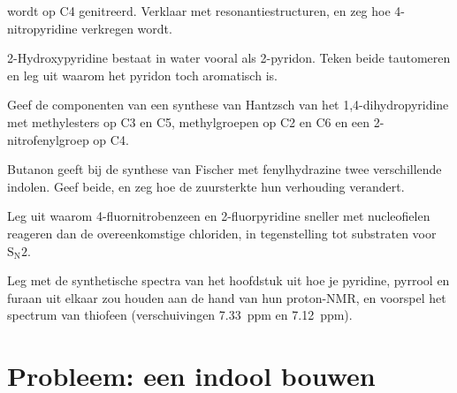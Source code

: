 \begin{exercise}[$\star\star$]\label{exo:b3:heterocycles:7}
 wordt op C4 genitreerd. Verklaar met
resonantiestructuren, en zeg hoe 4-nitropyridine verkregen wordt.
\end{exercise}

\begin{exercise}[$\star\star$]\label{exo:b3:heterocycles:8}
2-Hydroxypyridine bestaat in water vooral als 2-pyridon. Teken beide
tautomeren en leg uit waarom het pyridon toch aromatisch is.
\end{exercise}

\begin{exercise}[$\star\star$]\label{exo:b3:heterocycles:9}
Geef de componenten van een synthese van Hantzsch van het
1,4-dihydropyridine met methylesters op C3 en C5, methylgroepen op C2 en
C6 en een 2-nitrofenylgroep op C4.
\end{exercise}

\begin{exercise}[$\star\star\star$]\label{exo:b3:heterocycles:10}
Butanon geeft bij de synthese van Fischer met fenylhydrazine twee
verschillende indolen. Geef beide, en zeg hoe de zuursterkte hun
verhouding verandert.
\end{exercise}

\begin{exercise}[$\star\star\star$]\label{exo:b3:heterocycles:11}
Leg uit waarom 4-fluornitrobenzeen en 2-fluorpyridine sneller met
nucleofielen reageren dan de overeenkomstige chloriden, in tegenstelling tot substraten voor $\mathrm S_\mathrm N2$.
\end{exercise}

\begin{exercise}[$\star\star\star$]\label{exo:b3:heterocycles:12}
Leg met de synthetische spectra van het hoofdstuk uit hoe je pyridine,
pyrrool en furaan uit elkaar zou houden aan de hand van hun proton-NMR,
en voorspel het spectrum van
thiofeen (verschuivingen \qty{7.33}{ppm} en \qty{7.12}{ppm}).
\end{exercise}

\section{Probleem: een indool bouwen}

